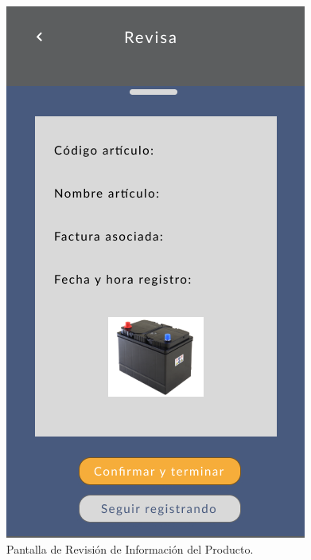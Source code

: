 \documentclass{scrreprt}
\begin{document}
    \begin{figure}[!htpb]
        \centerline{\includegraphics[scale=.35]{images/prototype/mobile/iPhone 8 - 4.png}}
        \caption{Pantalla de Revisión de Información del Producto.}
        \label{fig}
    \end{figure}
    \FloatBarrier
\end{document}
